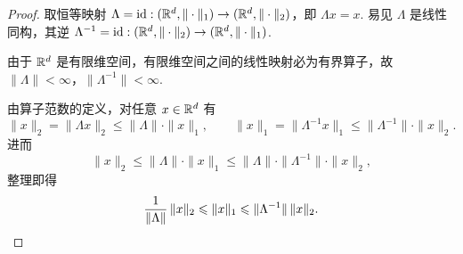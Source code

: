 \begin{proof}
    取恒等映射 $\Lambda = \mathrm{id}: (\mb{R}^d, \|\cdot\|_1) \to (\mb{R}^d, \|\cdot\|_2)$，即 $\Lambda x = x$. 易见 $\Lambda$ 是线性同构，其逆 $\Lambda^{-1} = \mathrm{id}: (\mb{R}^d, \|\cdot\|_2) \to (\mb{R}^d, \|\cdot\|_1)$.

    由于 $\mb{R}^d$ 是有限维空间，有限维空间之间的线性映射必为有界算子，故 $\|\Lambda\| < \infty$，$\|\Lambda^{-1}\| < \infty$.

    由算子范数的定义，对任意 $x \in \mb{R}^d$ 有
    \begin{equation*}
        \|x\|_2 = \|\Lambda x\|_2 \leq \|\Lambda\| \cdot \|x\|_1, \qquad
        \|x\|_1 = \|\Lambda^{-1} x\|_1 \leq \|\Lambda^{-1}\| \cdot \|x\|_2.
    \end{equation*}
    进而
    \begin{equation*}
        \|x\|_2 \leq \|\Lambda\| \cdot \|x\|_1 \leq \|\Lambda\| \cdot \|\Lambda^{-1}\| \cdot \|x\|_2,
    \end{equation*}
    整理即得
    \begin{equation*}
        \frac{1}{\|\Lambda\|}\,\|x\|_2 \leq \|x\|_1 \leq \|\Lambda^{-1}\|\,\|x\|_2.\qedhere
    \end{equation*}
\end{proof}


